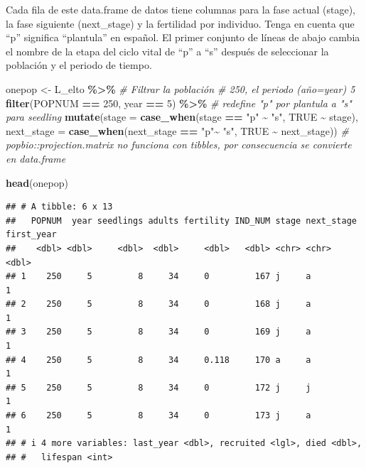 \documentclass[
]{book}
\newenvironment{Shaded}{\begin{snugshade}}{\end{snugshade}}
\newcommand{\AttributeTok}[1]{\textcolor[rgb]{0.13,0.29,0.53}{#1}}
\newcommand{\CommentTok}[1]{\textcolor[rgb]{0.56,0.35,0.01}{\textit{#1}}}
\newcommand{\ConstantTok}[1]{\textcolor[rgb]{0.56,0.35,0.01}{#1}}
\newcommand{\DecValTok}[1]{\textcolor[rgb]{0.00,0.00,0.81}{#1}}
\newcommand{\FunctionTok}[1]{\textcolor[rgb]{0.13,0.29,0.53}{\textbf{#1}}}
\newcommand{\NormalTok}[1]{#1}
\newcommand{\OtherTok}[1]{\textcolor[rgb]{0.56,0.35,0.01}{#1}}
\newcommand{\SpecialCharTok}[1]{\textcolor[rgb]{0.81,0.36,0.00}{\textbf{#1}}}
\newcommand{\StringTok}[1]{\textcolor[rgb]{0.31,0.60,0.02}{#1}}
\theoremstyle{definition}
\theoremstyle{definition}
\theoremstyle{definition}
\theoremstyle{definition}
\theoremstyle{remark}
\begin{document}
Cada fila de este data.frame de datos tiene columnas para la fase actual
(stage), la fase siguiente (next\_stage) y la fertilidad por individuo.
Tenga en cuenta que ``p'' significa ``plantula'' en español. El primer
conjunto de líneas de abajo cambia el nombre de la etapa del ciclo vital
de ``p'' a ``s'' después de seleccionar la población y el periodo de tiempo.

\begin{Shaded}
\begin{Highlighting}[]
\NormalTok{onepop }\OtherTok{\textless{}{-}}\NormalTok{ L\_elto }\SpecialCharTok{\%\textgreater{}\%}   
\CommentTok{\# Filtrar la población \# 250, el periodo (año=year) 5}
  \FunctionTok{filter}\NormalTok{(POPNUM }\SpecialCharTok{==} \DecValTok{250}\NormalTok{, year }\SpecialCharTok{==} \DecValTok{5}\NormalTok{) }\SpecialCharTok{\%\textgreater{}\%} 
  \CommentTok{\# redefine "p" por plantula a "s" para seedling}
  \FunctionTok{mutate}\NormalTok{(}\AttributeTok{stage =} \FunctionTok{case\_when}\NormalTok{(stage }\SpecialCharTok{==} \StringTok{"p"} \SpecialCharTok{\textasciitilde{}} \StringTok{"s"}\NormalTok{,}
                           \ConstantTok{TRUE} \SpecialCharTok{\textasciitilde{}}\NormalTok{ stage),}
         \AttributeTok{next\_stage =} \FunctionTok{case\_when}\NormalTok{(next\_stage }\SpecialCharTok{==} \StringTok{"p"}\SpecialCharTok{\textasciitilde{}} \StringTok{"s"}\NormalTok{,}
                                \ConstantTok{TRUE} \SpecialCharTok{\textasciitilde{}}\NormalTok{ next\_stage))}
\CommentTok{\# popbio::projection.matrix no funciona con tibbles, por consecuencia se convierte en data.frame}

\FunctionTok{head}\NormalTok{(onepop)}
\end{Highlighting}
\end{Shaded}

\begin{verbatim}
## # A tibble: 6 x 13
##   POPNUM  year seedlings adults fertility IND_NUM stage next_stage first_year
##    <dbl> <dbl>     <dbl>  <dbl>     <dbl>   <dbl> <chr> <chr>           <dbl>
## 1    250     5         8     34     0         167 j     a                   1
## 2    250     5         8     34     0         168 j     a                   1
## 3    250     5         8     34     0         169 j     a                   1
## 4    250     5         8     34     0.118     170 a     a                   1
## 5    250     5         8     34     0         172 j     j                   1
## 6    250     5         8     34     0         173 j     a                   1
## # i 4 more variables: last_year <dbl>, recruited <lgl>, died <dbl>,
## #   lifespan <int>
\end{verbatim}
\end{document}
